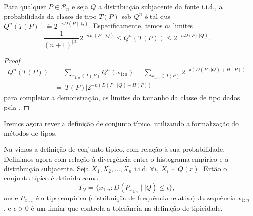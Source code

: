 \begin{theorem}\label{thm:limprobclasstype}
 Para qualquer $P \in \mathcal{P}_n$ e seja $Q$ a distribuição subjacente da fonte i.i.d., a probabilidade da classe de tipo
$T(P)$ sob $Q^n$ é tal que $Q^n(T(P)) \circeq 2^{-n D(P \mid \mid Q)}$. Especificamente, temos os limites
\begin{equation}
 \frac{1}{(n+1)^{\vert \mathcal{X} \vert}} 2^{-n D(P \mid \mid Q)} \leq Q^n(T(P)) \leq 2^{-nD(P \mid \mid Q)} .
\end{equation}
\end{theorem}
\begin{proof}
  \begin{subequations}
   \begin{align}
   Q^n(T(P)) &= \sum_{x_{1:n} \in T(P)} Q^n(x_{1:n}) = \sum_{x_{1:n} \in T(P)} 2^{-n (D(P \mid \mid Q) + H(P))} \\
             &= \vert T(P) \vert 2^{-n (D(P \mid \mid Q) + H(P))}
   \end{align}
  \end{subequations}
  para completar a demonstração, os limites do tamanho da classe de tipo dados pela .
\end{proof}


Iremos agora rever a definição de conjunto típico, utilizando a formalização do métodos de tipos.
\begin{definition}
  Na  vimos a definição de conjunto típico, com relação à sua probabilidade. Definimos agora
  com relação à divergência entre o histograma empírico e a distribuição subjacente.
  Seja $X_1, X_2, \ldots, X_n$ i.i.d. $\forall i$, $X_i \sim Q(x)$. Então o conjunto típico é definido como
  \begin{equation}
    T^{\epsilon}_{Q} = \{ x_{1:n} : D(P_{x_{1:n}} \mid \mid Q) \leq \epsilon \} ,
  \end{equation}
  onde $P_{x_{1:n}}$ é o tipo empírico (distribuição de frequência relativa) da sequência $x_{1:n}$,
  e $\epsilon > 0$ é um limiar que controla a tolerância na definição de tipicidade. 

\end{definition}

